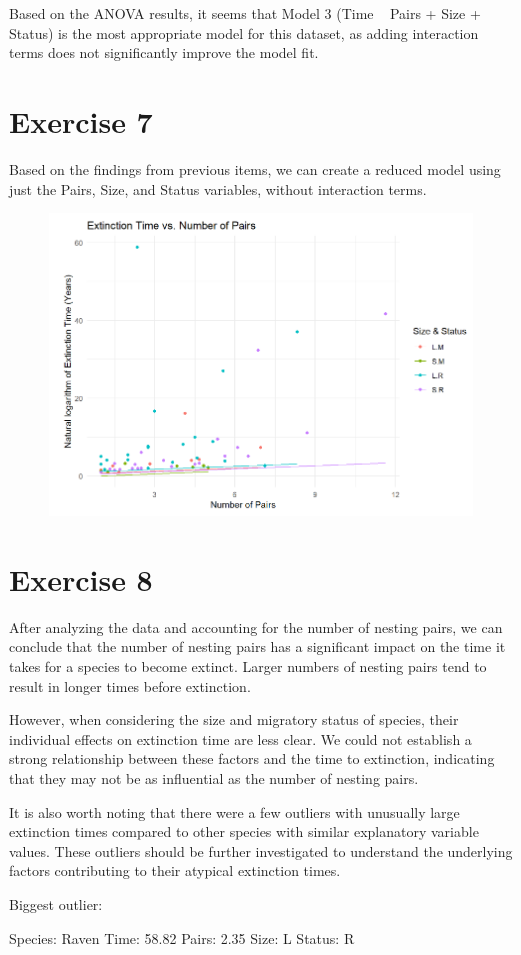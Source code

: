 \documentclass{article}
\begin{document}
Based on the ANOVA results, it seems that Model 3 (Time ~ Pairs + Size + Status) is the most appropriate model for this dataset, as adding interaction terms does not significantly improve the model fit.

\section{Exercise 7}
Based on the findings from previous items, we can create a reduced model using just the Pairs, Size, and Status variables, without interaction terms.



\begin{figure}
    \includegraphics[width=\linewidth]{graphs/graph7.png}
\end{figure}

\section{Exercise 8}
After analyzing the data and accounting for the number of nesting pairs, we can conclude that the number of nesting pairs has a significant impact on the time it takes for a species to become extinct. Larger numbers of nesting pairs tend to result in longer times before extinction.

However, when considering the size and migratory status of species, their individual effects on extinction time are less clear. We could not establish a strong relationship between these factors and the time to extinction, indicating that they may not be as influential as the number of nesting pairs.

It is also worth noting that there were a few outliers with unusually large extinction times compared to other species with similar explanatory variable values. These outliers should be further investigated to understand the underlying factors contributing to their atypical extinction times.

Biggest outlier:

Species: Raven
Time: 58.82
Pairs: 2.35
Size: L
Status: R
\end{document}

